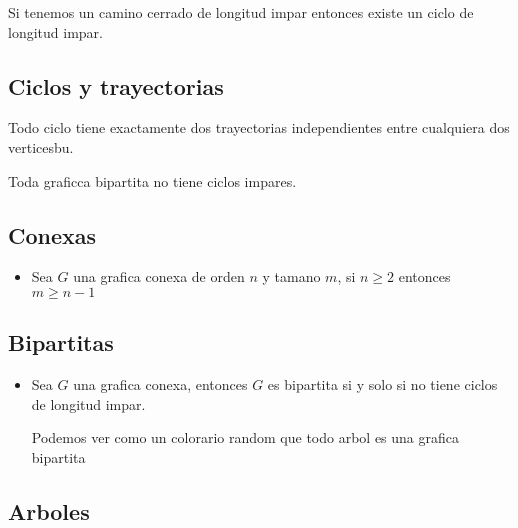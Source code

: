 \documentclass[12pt, fleqn]{report}                             %
\theoremstyle{break}                                            %
\begin{document}
                Si tenemos un camino cerrado de longitud impar 
                entonces existe un ciclo de longitud impar.

            \subsection{Ciclos y trayectorias}

                Todo ciclo tiene exactamente dos trayectorias independientes entre cualquiera
                dos verticesbu.

                Toda graficca bipartita no tiene ciclos impares.


            \subsection{Conexas}

                \begin{itemize}
                    \item Sea $G$ una grafica conexa de orden $n$ y tamano $m$, si $n \geq 2$ entonces $m \geq n - 1$
                \end{itemize}

            \subsection{Bipartitas}

                \begin{itemize}
                    \item Sea $G$ una grafica conexa, entonces $G$ 
                    es bipartita si y solo si no tiene ciclos de longitud impar.

                    Podemos ver como un colorario random que todo arbol es una grafica bipartita
                \end{itemize}


            \subsection{Arboles}
\end{document}
